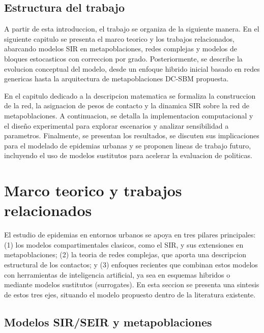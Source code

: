 \subsection{Estructura del trabajo}

A partir de esta introduccion, el trabajo se organiza de la siguiente manera. En el siguiente capitulo se presenta el marco teorico y los trabajos relacionados, abarcando modelos SIR en metapoblaciones, redes complejas y modelos de bloques estocasticos con correccion por grado. Posteriormente, se describe la evolucion conceptual del modelo, desde un enfoque hibrido inicial basado en redes genericas hasta la arquitectura de metapoblaciones DC-SBM propuesta.

En el capitulo dedicado a la descripcion matematica se formaliza la construccion de la red, la asignacion de pesos de contacto y la dinamica SIR sobre la red de metapoblaciones. A continuacion, se detalla la implementacion computacional y el diseño experimental para explorar escenarios y analizar sensibilidad a parametros. Finalmente, se presentan los resultados, se discuten sus implicaciones para el modelado de epidemias urbanas y se proponen lineas de trabajo futuro, incluyendo el uso de modelos sustitutos para acelerar la evaluacion de politicas.







\section{Marco teorico y trabajos relacionados}

El estudio de epidemias en entornos urbanos se apoya en tres pilares principales: 
(1) los modelos compartimentales clasicos, como el SIR, y sus extensiones en metapoblaciones; 
(2) la teoria de redes complejas, que aporta una descripcion estructural de los contactos; 
y (3) enfoques recientes que combinan estos modelos con herramientas de inteligencia artificial, ya sea en esquemas hibridos o mediante modelos sustitutos (surrogates). 
En esta seccion se presenta una sintesis de estos tres ejes, situando el modelo propuesto dentro de la literatura existente.

\subsection{Modelos SIR/SEIR y metapoblaciones}

